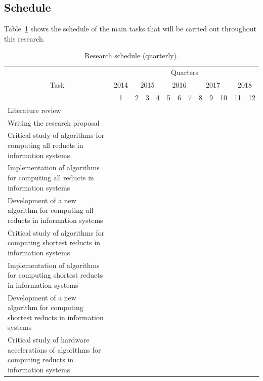 \documentclass[authoryear,11pt]{elsarticle}
\begin{document}
\clearpage 
\subsection{Schedule}
  Table~\ref{tab_Schedule} shows the schedule of the main tasks that will be carried out throughout this research.
 \begin{table}[h!]
		\caption{Research schedule (quarterly\protect\footnotemark).} \label{tab_Schedule}
		\centering
 	\begin{tabular}{|p{8cm}|c|c|c|c|c|c|c|c|c|c|c|c|}
 		\hline
		\multicolumn{1}{|c|}{\multirow{3}{*}{Task}} & \multicolumn{12}{c|}{Quarters}\\
 		\cline{2-13}
		 & 2014 & \multicolumn{3}{c|}{2015} & \multicolumn{3}{c|}{2016} & \multicolumn{3}{c|}{2017}
		 & \multicolumn{2}{c|}{2018} \\
 		\cline{2-13}
		 & 1 & 2 & 3 & 4 & 5 & 6 & 7 & 8 & 9 & 10 & 11 & 12 \\
		\hline
		Literature review &\cellcolor{blue}&\cellcolor{blue}&\cellcolor{blue}&
		\cellcolor[gray]{0.9}&\cellcolor[gray]{0.9}&\cellcolor[gray]{0.9}&\cellcolor[gray]{0.9}&
		\cellcolor[gray]{0.9}&\cellcolor[gray]{0.9}&\cellcolor[gray]{0.9}&\cellcolor[gray]{0.9}&
		\cellcolor[gray]{0.9}\\
		\hline
		Writing the research proposal &\cellcolor{blue}&\cellcolor{blue}&\cellcolor{blue}&&&&&&&&&\\
		\hline
		Critical study of algorithms for computing all reducts in information systems
		&\cellcolor{blue}&\cellcolor{blue}&\cellcolor{blue}&&&&&&&&&\\
		\hline
		Implementation of algorithms for computing all reducts in information systems
		&&\cellcolor{blue}&\cellcolor{blue}&&&&&&&&&\\
		\hline
		Development of a new algorithm for computing all reducts in information systems
		&&&&\cellcolor[gray]{0.9}&&&&&&&&\\
		\hline
		Critical study of algorithms for computing shortest reducts in information systems
		&&&&\cellcolor[gray]{0.9}&\cellcolor[gray]{0.9}&\cellcolor[gray]{0.9}&&&&&&\\
		\hline
		Implementation of algorithms for computing shortest reducts in information systems
		&&&&&\cellcolor[gray]{0.9}&\cellcolor[gray]{0.9}&&&&&&\\
		\hline
		Development of a new algorithm for computing shortest reducts in information systems
		&&&&&&&\cellcolor[gray]{0.9}&&&&&\\
		\hline
		Critical study of hardware accelerations of algorithms for computing reducts in information systems

\end{tabular}
\end{table}
\end{document}
